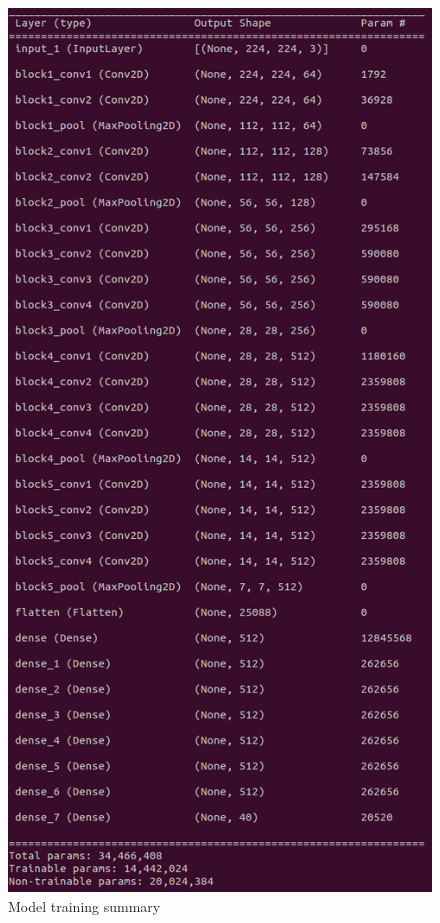 \documentclass{article}
\begin{document}
\begin{figure}
  \centering
  \includegraphics[scale=0.4]{Fig7}
  \caption{Model training summary}
  \label{Fig7}
\end{figure}
\end{document}
